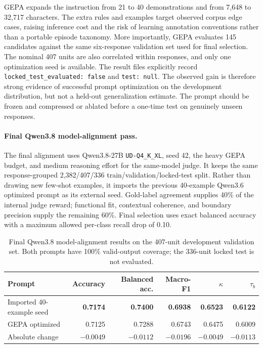 GEPA expands the instruction from 21 to 40 demonstrations and from 7,648 to
32,717 characters.  The extra rules and examples target observed corpus edge
cases, raising inference cost and the risk of learning annotation conventions
rather than a portable episode taxonomy.  More importantly, GEPA evaluates
145 candidates against the same six-response validation set used for final
selection.  The nominal 407 units are also correlated within responses, and
only one optimization seed is available.  The result files explicitly record
\texttt{locked\_test\_evaluated: false} and \texttt{test: null}.  The observed
gain is therefore strong evidence of successful prompt optimization on the
development distribution, but not a held-out generalization estimate.  The
prompt should be frozen and compressed or ablated before a one-time test on
genuinely unseen responses.

\paragraph{Final Qwen3.8 model-alignment pass.}
The final alignment uses Qwen3.8-27B
\texttt{UD-Q4\_K\_XL}, seed 42, the heavy GEPA budget, and medium reasoning
effort for the same-model judge.  It keeps the same response-grouped
2,382/407/336 train/validation/locked-test split.  Rather than drawing new
few-shot examples, it imports the previous 40-example Qwen3.6 optimized prompt
as its external seed.  Gold-label agreement supplies 40\% of the internal
judge reward; functional fit, contextual coherence, and boundary precision
supply the remaining 60\%.  Final selection uses exact balanced accuracy with
a maximum allowed per-class recall drop of 0.10.

\begin{table}[t]
\centering
\caption{Final Qwen3.8 model-alignment results on the 407-unit development
validation set.  Both prompts have 100\% valid-output coverage; the 336-unit
locked test is not evaluated.  }
\label{tab:exp0a-qwen38-final}
\begin{tabular}{lrrrrr}
\toprule
Prompt & Accuracy & Balanced acc. & Macro-F1 & $\kappa$ & $\tau_b$ \\
\midrule
Imported 40-example seed & \textbf{0.7174} & \textbf{0.7400} &
\textbf{0.6938} & \textbf{0.6523} & \textbf{0.6122} \\
GEPA optimized & 0.7125 & 0.7288 & 0.6743 & 0.6475 & 0.6009 \\
\midrule
Absolute change & $-0.0049$ & $-0.0112$ & $-0.0196$ & $-0.0049$ & $-0.0113$ \\
\bottomrule
\end{tabular}
\end{table}

